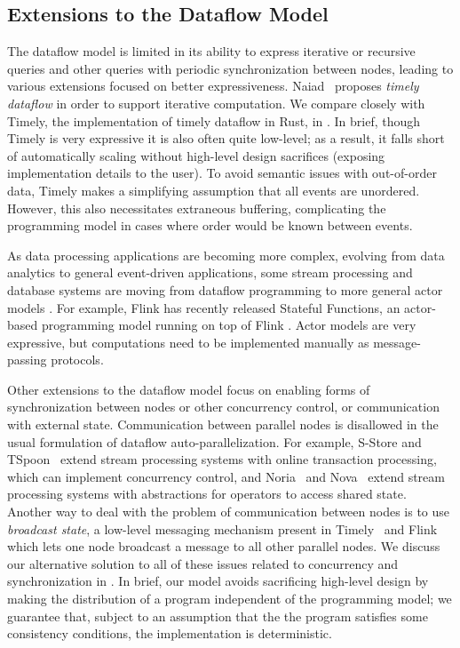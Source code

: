 \subsection{Extensions to the Dataflow Model}

The dataflow model is limited in its ability to express iterative or recursive queries and other queries with periodic synchronization between nodes, leading to various extensions focused on better expressiveness.
Naiad~\cite{Naiad2013,Timely} proposes \emph{timely dataflow} in order
to support iterative computation.
We compare closely with Timely, the implementation of timely dataflow in Rust, in .
In brief, though Timely is very expressive it is also often quite low-level; as a result, it falls short of automatically scaling without high-level design sacrifices (exposing implementation details to the user).
To avoid semantic issues with out-of-order data,
Timely makes a simplifying assumption that all events are unordered.
However, this also necessitates extraneous buffering, complicating the programming model in cases where order would be known between events.

As data processing applications are becoming more complex, evolving from
data analytics to general event-driven applications, some stream
processing and database systems are moving from dataflow programming to more
general actor models
\cite{CarboneFKK20,Bernstein19,BernsteinDKM17,Das2018,xu2021move}.
For example, Flink has recently released Stateful Functions,
an actor-based programming model running on top of Flink
\cite{AkhterFK19,StatefulFunctions}.
Actor models are very expressive, but computations need to be implemented manually as
message-passing protocols.

Other extensions to the dataflow model focus on enabling forms of synchronization between nodes or other concurrency control, or communication with external state.
Communication between parallel nodes is disallowed in the usual formulation of dataflow auto-parallelization.
For example, S-Store and TSpoon~\cite{meehan2015s,affetti2020tspoon} extend stream processing systems with online transaction processing, which can implement concurrency control,
and Noria~\cite{gjengset2018noria} and Nova~\cite{zhao2021timestamped} extend stream processing systems with abstractions for operators to access shared state.
Another way to deal with the problem of communication between nodes
is to use \emph{broadcast state}, a low-level messaging mechanism present in
Timely~\cite{BroadcastStateTimely} and Flink~\cite{BroadcastStateFlink}
which lets one node broadcast a message to all other parallel nodes.
We discuss our alternative solution to all of these issues related to concurrency and synchronization in .
In brief, our model avoids sacrificing high-level design by making the distribution of a program independent of the programming model; we guarantee that, subject to an assumption that the the program satisfies some consistency conditions, the implementation is deterministic.

